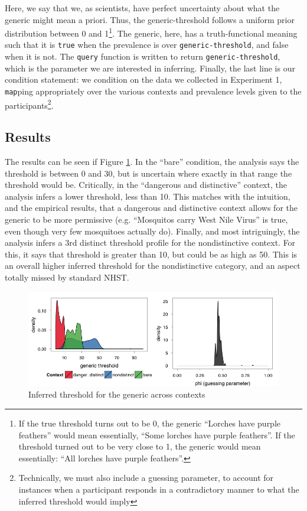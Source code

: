 \documentclass[10pt,letterpaper]{article}
\begin{document}
Here, we say that we, as scientists, have perfect uncertainty about what the generic might mean a priori. Thus, the generic-threshold follows a uniform prior distribution between 0 and 1\footnote{If the true threshold turns out to be 0, the generic ``Lorches have purple feathers'' would mean essentially, ``Some lorches have purple feathers''. If the threshold turned out to be very close to 1, the generic would mean essentially: ``All lorches have purple feathers''.}. The generic, here, has a truth-functional meaning such that it is \lstinline{true} when the prevalence is over \lstinline{generic-threshold}, and false when it is not. The \lstinline{query} function is written to return \lstinline{generic-threshold}, which is the parameter we are interested in inferring. Finally, the last line is our condition statement: we condition on the data we collected in Experiment 1, \lstinline{map}ping appropriately over the various contexts and prevalence levels given to the participants\footnote{Technically, we must also include a guessing parameter, to account for instances when a participant responds in a contradictory manner to what the inferred threshold would imply}. 

\subsection{Results}

The results can be seen if Figure \ref{fig:bda1a}. In the ``bare'' condition, the analysis says the threshold is between 0 and 30, but is uncertain where exactly in that range the threshold would be. Critically, in the ``dangerous and distinctive'' context, the analysis infers a lower threshold, less than 10. This matches with the intuition, and the empirical results, that a dangerous and distinctive context allows for the generic to be more permissive (e.g. ``Mosquitos carry West Nile Virus'' is true, even though very few mosquitoes actually do). Finally, and most intriguingly, the analysis infers a 3rd distinct threshold profile for the nondistinctive context.  For this, it says that threshold is greater than 10, but could be as high as 50. This is an overall higher inferred threshold for the nondistinctive category, and an aspect totally missed by standard NHST. 

\begin{figure}
\centering
    \includegraphics[width=\columnwidth]{fig2_bda1_combined}
    \caption{Inferred threshold for the generic across contexts}
  \label{fig:bda1a}
\end{figure}
\end{document}
